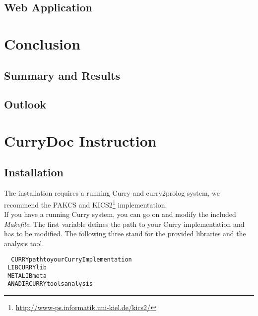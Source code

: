 \documentclass[%
	pdftex,%
	a4paper,%
	oneside,%
	chapterprefix,%
	headsepline,%
	12pt%
]{scrbook}
\begin{document}
\section{Web Application}
\chapter{Conclusion}\label{conclusion}
\section{Summary and Results}
\section{Outlook}

\newpage
{}
\setcounter{page}{\value{roemisch}}

\appendix
\chapter{CurryDoc Instruction}\label{a:currydoc}
\section{Installation}

The installation requires a running Curry and curry2prolog system, we
recommend the PAKCS and
KICS2\footnote{\url{http://www-ps.informatik.uni-kiel.de/kics2/}}
implementation. \\

If you have a running Curry system, you can go on and modify the
included \emph{Makefile}. %
The first variable defines the path to your Curry implementation and
has to be modified. %
The following three stand for the provided libraries and the analysis
tool. %

\begin{tabbing}\tt
~CURRYpathtoyourCurryImplementation\\
\tt ~LIBCURRYlib\\
\tt ~METALIBmeta\\
\tt ~ANADIRCURRYtoolsanalysis
\end{tabbing}
\end{document}
